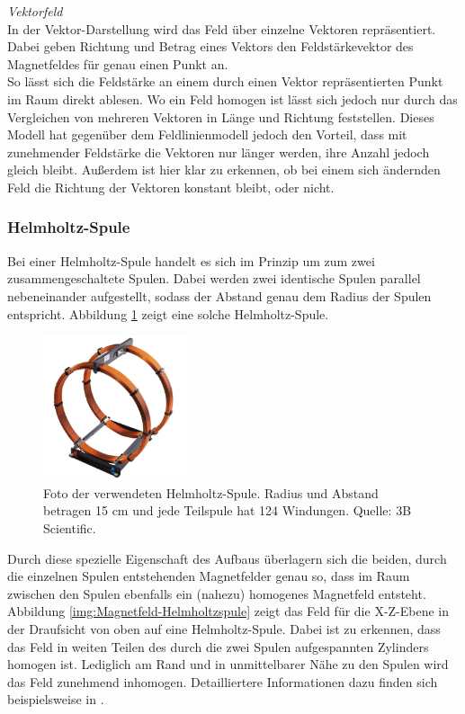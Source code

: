 \textit{Vektorfeld}\\
In der Vektor-Darstellung wird das Feld über einzelne Vektoren repräsentiert. Dabei geben Richtung und Betrag eines Vektors den Feldstärkevektor des Magnetfeldes für genau einen Punkt an.\\
So lässt sich die Feldstärke an einem durch einen Vektor repräsentierten Punkt im Raum direkt ablesen. Wo ein Feld homogen ist lässt sich jedoch nur durch das Vergleichen von mehreren Vektoren in Länge und Richtung feststellen. Dieses Modell hat gegenüber dem Feldlinienmodell jedoch den Vorteil, dass mit zunehmender Feldstärke die Vektoren nur länger werden, ihre Anzahl jedoch gleich bleibt. Außerdem ist hier klar zu erkennen, ob bei einem sich ändernden Feld die Richtung der Vektoren konstant bleibt, oder nicht.

\subsubsection{Helmholtz-Spule}
\label{sec-2-3-3}
Bei einer Helmholtz-Spule handelt es sich im Prinzip um zum zwei zusammengeschaltete Spulen. Dabei werden zwei identische Spulen parallel nebeneinander aufgestellt, sodass der Abstand genau dem Radius der Spulen entspricht. Abbildung \ref{img:Helmholtz} zeigt eine solche Helmholtz-Spule.\\
\begin{figure}
	\centering
	\includegraphics[width=0.38\textwidth]{images/papers/Helmholtz.jpg}
	\caption{Foto der verwendeten Helmholtz-Spule. Radius und Abstand betragen 15 cm und jede Teilspule hat 124 Windungen. Quelle: 3B Scientific.}
	\label{img:Helmholtz}
\end{figure}


Durch diese spezielle Eigenschaft des Aufbaus überlagern sich die beiden, durch die einzelnen Spulen entstehenden Magnetfelder genau so, dass im Raum zwischen den Spulen ebenfalls ein (nahezu) homogenes Magnetfeld entsteht. Abbildung \ref{img:Magnetfeld-Helmholtzspule} zeigt das Feld für die X-Z-Ebene in der Draufsicht von oben auf eine Helmholtz-Spule. Dabei ist zu erkennen, dass das Feld in weiten Teilen des durch die zwei Spulen aufgespannten Zylinders homogen ist. Lediglich am Rand und in unmittelbarer Nähe zu den Spulen wird das Feld zunehmend inhomogen. Detailliertere Informationen dazu finden sich beispielsweise in \cite{Demtroder13}.\\

